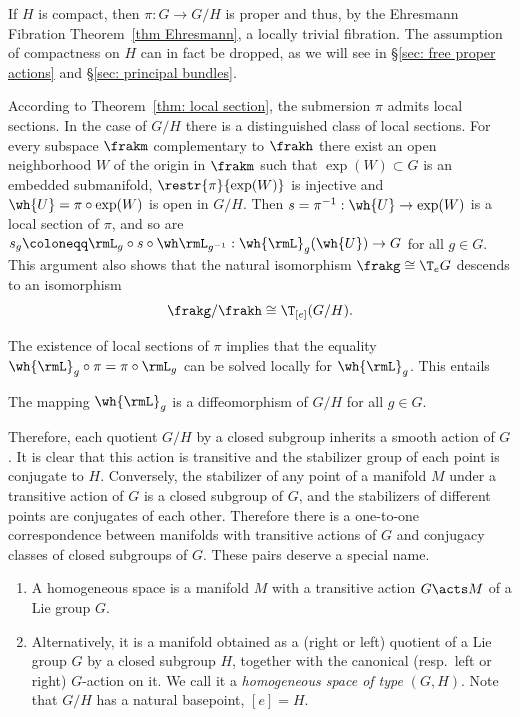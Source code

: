 \begin{rem}
    If $H$ is compact, then $\pi:G\to G\slash H$ is proper and thus, by the Ehresmann Fibration Theorem~\ref{thm Ehresmann}, a locally trivial fibration. The assumption of compactness on $H$ can in fact be dropped, as we will see in \S\ref{sec: free proper actions} and \S\ref{sec: principal bundles}.
\end{rem}

\begin{rem}
    According to Theorem~\ref{thm: local section}, the submersion $\pi$ admits local sections. In the case of $G\slash H$ there is a distinguished class of local sections. For every subspace $\frakm$ complementary to $\frakh$ there exist an open neighborhood $W$ of the origin in $\frakm$ such that $\exp(W)\subset G$ is an embedded submanifold, $\restr{\pi}{\exp(W)}$ is injective and $\wh{U}=\pi\circ\exp(W)$ is open in $G\slash H$. Then $s=\pi^{-1}:\wh{U}\to \exp(W)$ is a local section of $\pi$, and so are $s_g\coloneqq \rmL_g\circ s\circ \wh\rmL_{g^{-1}}:\wh{\rmL}_g(\wh{U})\to G$ for all $g\in G$. This argument also shows that the natural isomorphism $\frakg\cong \T_e G$ descends to an isomorphism 
    \[\frakg\slash \frakh\cong \T_{[e]}(G\slash H).\]
\end{rem}

The existence of local sections of $\pi$ implies that the equality $\wh{\rmL}_g\circ\pi=\pi\circ \rmL_g$ can be solved locally for $\wh{\rmL}_g$. This entails
\begin{cor}
    The mapping $\wh{\rmL}_g$ is a diffeomorphism of $G\slash H$ for all $g\in G$.
\end{cor}

Therefore, each quotient $G\slash H$ by a closed subgroup inherits a smooth action of $G$. It is clear that this action is transitive and the stabilizer group of each point is conjugate to $H$. Conversely, the stabilizer of any point of a manifold $M$ under a transitive action of $G$ is a closed subgroup of $G$, and the stabilizers of different points are conjugates of each other. Therefore there is a one-to-one correspondence between manifolds with transitive actions of $G$ and conjugacy classes of closed subgroups of $G$. These pairs deserve a special name.

\begin{defn}
    \begin{enumerate}
        \item A homogeneous space is a manifold $M$ with a transitive action $G\acts M$ of a Lie group $G$. 
        \item Alternatively, it is a manifold obtained as a (right or left) quotient of a Lie group $G$ by a closed subgroup $H$, together with the canonical (resp.~left or right) $G$-action on it. We call it a \emph{homogeneous space of type} $(G,H)$. Note that $G\slash H$ has a natural basepoint, $[e]=H$.
    \end{enumerate}
\end{defn}

